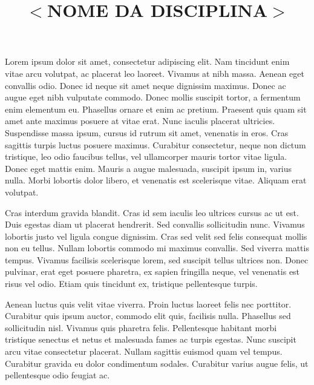 \documentclass[a4paper]{article}
\title{$<$NOME DA DISCIPLINA$>$}
\begin{document}
    \header{}
    
    \begin{answer}
        Lorem ipsum dolor sit amet, consectetur adipiscing elit. Nam tincidunt enim vitae arcu volutpat, ac placerat leo laoreet. Vivamus at nibh massa. Aenean eget convallis odio. Donec id neque sit amet neque dignissim maximus. Donec ac augue eget nibh vulputate commodo. Donec mollis suscipit tortor, a fermentum enim elementum eu. Phasellus ornare et enim ac pretium. Praesent quis quam sit amet ante maximus posuere at vitae erat. Nunc iaculis placerat ultricies. Suspendisse massa ipsum, cursus id rutrum sit amet, venenatis in eros. Cras sagittis turpis luctus posuere maximus. Curabitur consectetur, neque non dictum tristique, leo odio faucibus tellus, vel ullamcorper mauris tortor vitae ligula. Donec eget mattis enim. Mauris a augue malesuada, suscipit ipsum in, varius nulla. Morbi lobortis dolor libero, et venenatis est scelerisque vitae. Aliquam erat volutpat.

        Cras interdum gravida blandit. Cras id sem iaculis leo ultrices cursus ac ut est. Duis egestas diam ut placerat hendrerit. Sed convallis sollicitudin nunc. Vivamus lobortis justo vel ligula congue dignissim. Cras sed velit sed felis consequat mollis non eu tellus. Nullam lobortis commodo mi maximus convallis. Sed viverra mattis tempus. Vivamus facilisis scelerisque lorem, sed suscipit tellus ultrices non. Donec pulvinar, erat eget posuere pharetra, ex sapien fringilla neque, vel venenatis est risus vel odio. Etiam quis tincidunt ex, tristique pellentesque turpis.

        Aenean luctus quis velit vitae viverra. Proin luctus laoreet felis nec porttitor. Curabitur quis ipsum auctor, commodo elit quis, facilisis nulla. Phasellus sed sollicitudin nisl. Vivamus quis pharetra felis. Pellentesque habitant morbi tristique senectus et netus et malesuada fames ac turpis egestas. Nunc suscipit arcu vitae consectetur placerat. Nullam sagittis euismod quam vel tempus. Curabitur gravida eu dolor condimentum sodales. Curabitur varius augue felis, ut pellentesque odio feugiat ac.
    \end{answer}
    
\end{document}
